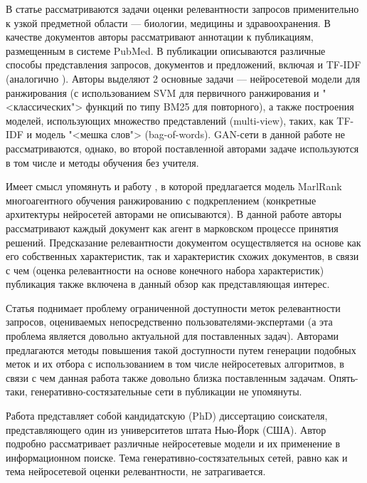 В статье \cite{DBLP:journals/corr/abs-1910-00314} рассматриваются задачи оценки релевантности запросов применительно к узкой
предметной области --- биологии, медицины и здравоохранения. В качестве документов авторы рассматривают аннотации к публикациям,
размещенным в системе PubMed. В публикации описываются различные способы представления запросов, документов и предложений, включая
и TF-IDF (аналогично \cite{DBLP:journals/corr/abs-2001-09896}). Авторы выделяют 2 основные задачи --- нейросетевой модели для
ранжирования (с использованием SVM для первичного ранжирования и "<классических"> функций по типу BM25 для повторного), а также
построения моделей, использующих множество представлений (multi-view), таких, как TF-IDF и модель "<мешка слов"> (bag-of-words).
GAN-сети в данной работе не рассматриваются, однако, во второй поставленной авторами задаче используются в том числе и методы
обучения без учителя.

Имеет смысл упомянуть и работу \cite{DBLP:journals/corr/abs-1909-06859}, в которой предлагается модель MarlRank многоагентного
обучения ранжированию с подкреплением (конкретные архитектуры нейросетей авторами не описываются). В данной работе авторы
рассматривают каждый документ как агент в марковском процессе принятия решений. Предсказание релевантности документом
осуществляется на основе как его собственных характеристик, так и характеристик схожих документов, в связи с чем (оценка
релевантности на основе конечного набора характеристик) публикация также включена в данный обзор как представляющая интерес.

Статья \cite{DBLP:journals/corr/abs-1907-08657} поднимает проблему ограниченной доступности меток релевантности запросов,
оцениваемых непосредственно пользователями-экспертами (а эта проблема является довольно актуальной для поставленных задач).
Авторами предлагаются методы повышения такой доступности путем генерации подобных меток и их отбора с использованием в
том числе нейросетевых алгоритмов, в связи с чем данная работа также довольно близка поставленным задачам. Опять-таки,
генеративно-состя\-зательные сети в публикации не упомянуты.

Работа \cite{DBLP:journals/corr/abs-1908-06132} представляет собой кандидатскую (PhD) диссертацию соискателя, представляющего
один из университетов штата Нью-Йорк (США). Автор подробно рассматривает различные нейросетевые модели и их применение в информационном
поиске. Тема генеративно-состязательных сетей, равно как и тема нейросетевой оценки релевантности, не затрагивается.

